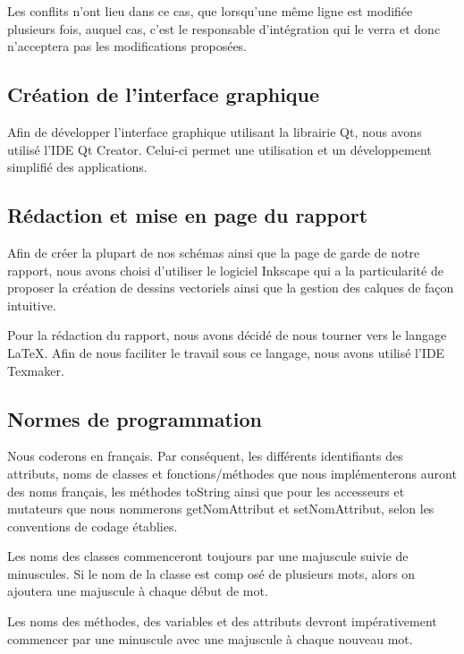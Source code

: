 \documentclass{report}
\begin{document}
	Les conflits n'ont lieu dans ce cas, que lorsqu'une même ligne est modifiée plusieurs fois, auquel cas, c'est le responsable d'intégration qui le verra et donc n'acceptera pas les modifications proposées.
					


			

\subsection{Création de l'interface graphique}
\hspace{0.5cm}Afin de développer l'interface graphique utilisant la librairie Qt, nous avons utilisé l'IDE Qt Creator. Celui-ci permet une utilisation et un développement simplifié des applications.
\subsection{Rédaction et mise en page du rapport}
\hspace{0.5cm}Afin de créer la plupart de nos schémas ainsi que la page de garde de notre rapport, nous avons choisi d'utiliser le logiciel Inkscape qui a la particularité de proposer la création de dessins vectoriels ainsi que la gestion des calques de façon intuitive.
			
			Pour la rédaction du rapport, nous avons décidé de nous tourner vers le langage \LaTeX . Afin de nous faciliter le travail sous ce langage, nous avons utilisé l'IDE Texmaker.
\subsection{Normes de programmation}
\hspace{0.5cm}Nous coderons en français. Par conséquent, les différents identifiants des attributs, noms de classes et fonctions/méthodes que nous implémenterons auront des noms français, les méthodes toString ainsi que pour les accesseurs et mutateurs que nous nommerons getNomAttribut et setNomAttribut,
selon les conventions de codage établies.\par

Les noms des classes commenceront toujours par une majuscule suivie de minuscules. Si le nom de la classe est comp osé de plusieurs mots, alors on ajoutera une majuscule à chaque début de mot.\par

Les noms des méthodes, des variables et des attributs devront impérativement commencer par une minuscule avec une majuscule à chaque nouveau mot.\par
\end{document}
